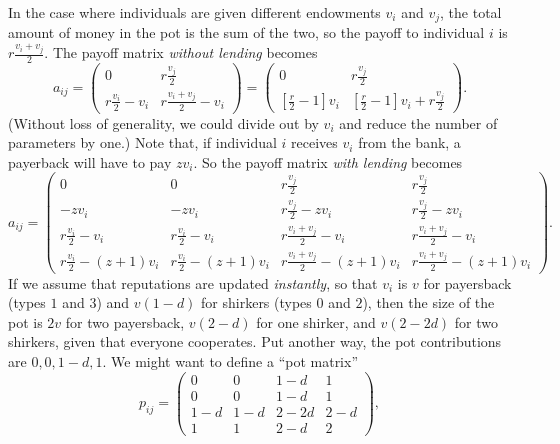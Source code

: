 \documentclass[13pt]{amsart}
\begin{document}
In the case where individuals are given different endowments $v_i$ and $v_j$, the total amount of money in the pot is the sum of the two, so the payoff to individual $i$ is $r\frac{v_i + v_j}{2}$.
The payoff matrix \emph{without lending} becomes
\begin{equation}
    a_{ij} =
        \begin{pmatrix}
            0 & r\frac{v_j}{2} \\
            r\frac{v_i}{2} - v_i & r\frac{v_i + v_j}{2} - v_i
        \end{pmatrix}
        =
        \begin{pmatrix}
            0 & r\frac{v_j}{2} \\
            [\frac{r}{2} - 1] v_i & [\frac{r}{2} - 1]v_i + r\frac{v_j}{2}
        \end{pmatrix}.
\end{equation}
(Without loss of generality, we could divide out by $v_i$ and reduce the number of parameters by one.)
Note that, if individual $i$ receives $v_i$ from the bank, a payerback will have to pay $zv_i$.
So the payoff matrix \emph{with lending} becomes
\begin{equation}
    a_{ij} =
    \begin{pmatrix}
        0 & 0 & r\frac{v_j}{2} & r\frac{v_j}{2} \\
        -zv_i & -zv_i & r\frac{v_j}{2} - zv_i & r\frac{v_j}{2} - zv_i \\
        r\frac{v_i}{2} - v_i & r\frac{v_i}{2} - v_i & r\frac{v_i + v_j}{2} - v_i & r\frac{v_i + v_j}{2} - v_i \\
        r\frac{v_i}{2} - (z+1)v_i & r\frac{v_i}{2} - (z+1)v_i  & r\frac{v_i + v_j}{2} - (z+1)v_i & r\frac{v_i + v_j}{2} - (z+1)v_i
    \end{pmatrix}.
\end{equation}
If we assume that reputations are updated \emph{instantly}, so that $v_i$ is $v$ for payersback (types $1$ and $3$) and $v(1-d)$ for shirkers (types $0$ and $2$), then the size of the pot is $2v$ for two payersback, $v(2-d)$ for one shirker, and $v(2 - 2d)$ for two shirkers, given that everyone cooperates.
Put another way, the pot contributions are $0, 0, 1-d, 1$.
We might want to define a ``pot matrix''
\begin{equation}
    p_{ij} =
    \begin{pmatrix}
        0 & 0 & 1-d & 1 \\
        0 & 0 & 1-d & 1 \\
        1-d & 1-d & 2-2d & 2-d \\
        1 & 1 & 2-d & 2
    \end{pmatrix},
\end{equation}
\end{document}
